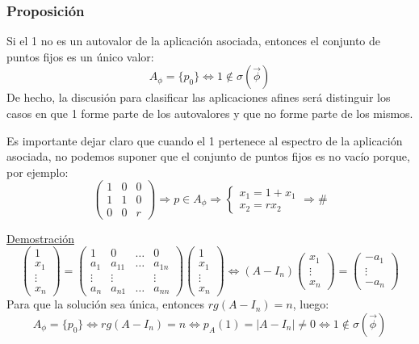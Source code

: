\documentclass[10pt,a4paper,openright]{book}
\begin{document}
\subsubsection*{Proposición}
Si el 1 no es un autovalor de la aplicación asociada, entonces el conjunto de puntos fijos es un único valor:
$$A_\phi = \{p_0\} \Leftrightarrow 1 \notin \sigma(\vec{\phi})$$
De hecho, la discusión para clasificar las aplicaciones afines será distinguir los casos en que 1 forme parte de los autovalores y que no forme parte de los mismos.

Es importante dejar claro que cuando el 1 pertenece al espectro de la aplicación asociada, no podemos suponer que el conjunto de puntos fijos es no vacío porque, por ejemplo:
$$\left(\begin{array}{c|cc}
1  & 0 & 0 \\
\hline
1 & 1 &  0 \\
0 & 0 &  r
\end{array}
\right) \Rightarrow p\in A_\phi \Rightarrow \begin{cases} x_1 =1 + x_1  \\ x_2 = rx_2 \end{cases} \Rightarrow \#$$

\underline{Demostración}
$$\begin{pmatrix}
1 \\ x_1 \\ \vdots \\ x_n
\end{pmatrix} = \left(\begin{array}{c|ccc}
1  & 0 & \ldots & 0 \\
\hline
a_1  & a_{11} & \ldots & a_{1n} \\
\vdots & \vdots &  & \vdots \\
a_n & a_{n1} & \ldots & a_{nn}
\end{array}
\right) \begin{pmatrix}
1 \\ x_1 \\ \vdots \\ x_n
\end{pmatrix} \Leftrightarrow (A - I_n) \begin{pmatrix}
x_1 \\ \vdots \\ x_n
\end{pmatrix} = \begin{pmatrix}
-a_1 \\ \vdots \\ -a_n
\end{pmatrix}$$
Para que la solución sea única, entonces $rg(A-I_n) = n$, luego:
$$A_\phi = \{p_0\} \Leftrightarrow rg(A - I_n) = n \Leftrightarrow p_A (1) = |A - I_n| \neq 0 \Leftrightarrow 1\notin \sigma(\vec{\phi})$$
\end{document}

